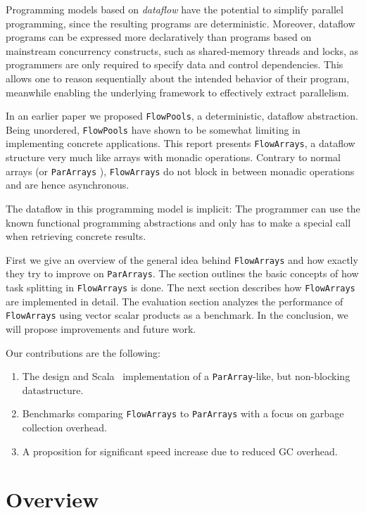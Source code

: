 \documentclass[runningheads,a4paper,fleqn]{llncs}
\begin{document}
Programming models based on \emph{dataflow} \cite{Arvind89,CnC10} have the
potential to simplify parallel programming, since the resulting programs are
deterministic. Moreover, dataflow programs can be expressed more declaratively
than programs based on mainstream concurrency constructs, such as shared-memory 
threads and locks, as programmers are only required to specify data and
control dependencies. This allows one to reason sequentially about the
intended behavior of their program, meanwhile enabling the underlying
framework to effectively extract parallelism.

In an earlier paper \cite{FP12} we proposed \texttt{FlowPools}, a
deterministic, dataflow abstraction. Being unordered, \texttt{FlowPools} have
shown to be somewhat limiting in implementing concrete applications. This
report presents \texttt{FlowArrays}, a dataflow structure very much like arrays
with monadic operations. Contrary to normal arrays (or \texttt{ParArrays}
\cite{collect11}), \texttt{FlowArrays} do not block in between monadic
operations and are hence asynchronous.

The dataflow in this programming model is implicit: The programmer can
use the known functional programming abstractions and only has to
make a special call when retrieving concrete results.

First we give an overview of the general idea behind \texttt{FlowArrays} and
how exactly they try to improve on \texttt{ParArrays}. The section outlines the
basic concepts of how task splitting in \texttt{FlowArrays} is done. The next
section describes how \texttt{FlowArrays} are implemented in detail. The
evaluation section analyzes the performance of \texttt{FlowArrays} using vector
scalar products as a benchmark. In the conclusion, we will propose
improvements and future work.

Our contributions are the following:
\begin{enumerate}
\item The design and Scala~\cite{Odersky10} implementation of a
  \texttt{ParArray}-like, but non-blocking datastructure.
\item Benchmarks comparing \texttt{FlowArrays} to \texttt{ParArrays} with a focus on
  garbage collection overhead.
\item A proposition for significant speed increase due to reduced GC
  overhead.
\end{enumerate}

\section{Overview}
\label{sec:overview}
\end{document}
